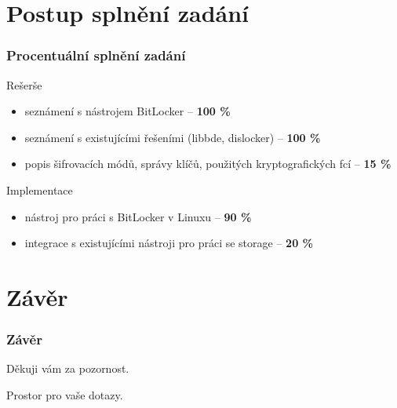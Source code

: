\documentclass{beamer}
\begin{document}

\section{Postup splnění zadání}

\begin{frame}
  \frametitle{Procentuální splnění zadání}
	\begin{block}{Rešerše}
		\begin{itemize}
			\item seznámení s nástrojem BitLocker -- \textbf{100 \%}
			\item seznámení s existujícími řešeními (libbde, dislocker) -- \textbf{100 \%}
			\item popis šifrovacích módů, správy klíčů, použitých kryptografických fcí -- \textbf{15 \%}
		\end{itemize}
	\end{block}

	\begin{block}{Implementace}
		\begin{itemize}
			\item nástroj pro práci s BitLocker v Linuxu -- \textbf{90 \%}
			\item integrace s existujícími nástroji pro práci se storage -- \textbf{20 \%}
		\end{itemize}
	\end{block}

\end{frame}


\section{Závěr}

\begin{frame}
	\frametitle{Závěr}

	\begin{center}
	Děkuji vám za pozornost.
	\end{center}

\vspace{0.5cm}

	\begin{center}
	Prostor pro vaše dotazy.
	\end{center}
\end{frame}
\end{document}
